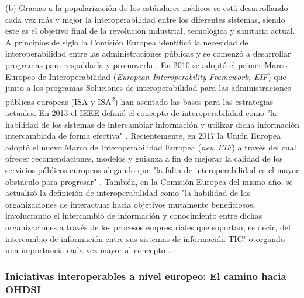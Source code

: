 (b) Gracias a la popularización de los estándares médicos se está desarrollando cada vez más y mejor la interoperabilidad entre los diferentes sistemas, siendo este es el objetivo final de la revolución industrial, tecnológica y sanitaria actual. A principios de siglo la Comisión Europea identificó la necesidad de interoperabilidad entre las administraciones públicas y se comenzó a desarrollar programas para respaldarla y promoverla \cite{CEU1999ida}. En 2010 se adoptó el primer Marco Europeo de Interoperabilidad (\textit{European Interoperability Framework, EIF}) que junto a los programas Soluciones de interoperabilidad para las administraciones públicas europeas (ISA y ISA\textsuperscript{2}) han asentado las bases para las estrategias actuales. En 2013 el IEEE definió el concepto de interoperabilidad como "la habilidad de los sistemas de intercambiar información y utilizar dicha información intercambiada de forma efectiva" \cite{berryman2013data}. Recientemente, en 2017 la Unión Europea adoptó el nuevo Marco de Interoperabilidad Europea (\textit{new EIF})  a través del cual ofrecer recomendaciones, modelos y guianza a fin de mejorar la calidad de los servicios públicos europeos alegando que "la falta de interoperabilidad es el mayor obstáculo para progresar" \cite{kouroubali2019new}. También, en la Comisión Europea del mismo año, se actualizó la definición de interoperabilidad como "la habilidad de las organizaciones de interactuar hacia objetivos mutamente beneficiosos, involucrando el intercambio de información y conocimiento entre dichas organizaciones a través de los procesos empresariales que soportan, es decir, del intercambio de información entre sus sistemas de información TIC" otorgando una importancia cada vez mayor al concepto \cite{katehakis2019framework}\cite{CEU2017eif} \cite{casiano2022towards}.



\subsubsection{Iniciativas interoperables a nivel europeo: El camino hacia OHDSI}

